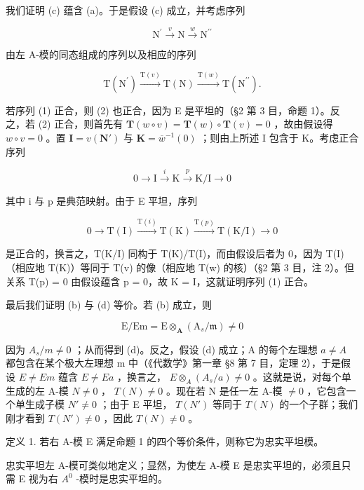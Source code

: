 我们证明 (c) 蕴含 (a)。于是假设 (c) 成立，并考虑序列

\[
\mathrm{N} ^ {\prime} \xrightarrow {v} \mathrm{N} \xrightarrow {w} \mathrm{N} ^ {\prime \prime}\tag{1}
\]

由左 A-模的同态组成的序列以及相应的序列

\[
\mathrm{T} \left(\mathrm{N} ^ {\prime}\right) \xrightarrow {\mathrm{T} (v)} \mathrm{T} (\mathrm{N}) \xrightarrow {\mathrm{T} (w)} \mathrm{T} \left(\mathrm{N} ^ {\prime \prime}\right).\tag{2}
\]

若序列 (1) 正合，则 (2) 也正合，因为 E 是平坦的（§2 第 3 目，命题 1）。反之，若 (2) 正合，则首先有 \(\mathbf{T}(w \circ v) = \mathbf{T}(w) \circ \mathbf{T}(v) = 0\) ，故由假设得 \(w \circ v = 0\) 。置 \(\mathbf{I} = v(\mathbf{N}')\) 与 \(\mathbf{K} = \overline{w}^{-1}(0)\) ；则由上所述 I 包含于 K。考虑正合序列

\[
0 \longrightarrow \mathrm{I} \stackrel {i} {\longrightarrow} \mathrm{K} \stackrel {p} {\longrightarrow} \mathrm{K} / \mathrm{I} \longrightarrow 0
\]

其中 i 与 p 是典范映射。由于 E 平坦，序列

\[
0 \longrightarrow \mathrm{T} (\mathrm{I}) \xrightarrow {\mathrm{T} (i)} \mathrm{T} (\mathrm{K}) \xrightarrow {\mathrm{T} (p)} \mathrm{T} (\mathrm{K} / \mathrm{I}) \longrightarrow 0
\]

是正合的，换言之，T(K/I) 同构于 T(K)/T(I)，而由假设后者为 0，因为 T(I)（相应地 T(K)）等同于 T(v) 的像（相应地 T(w) 的核）（§2 第 3 目，注 2）。但关系 T(p) = 0 由假设蕴含 p = 0，故 K = I，这就证明序列 (1) 正合。

最后我们证明 (b) 与 (d) 等价。若 (b) 成立，则

\[
\mathrm{E} / \mathrm{Em} = \mathrm{E} \otimes_ {\mathbf {A}} (\mathrm{A} _ {s} / \mathfrak {m}) \neq 0
\]

因为 \(A_{s}/m \neq 0\) ；从而得到 (d)。反之，假设 (d) 成立；A 的每个左理想 \(a \neq A\) 都包含在某个极大左理想 m 中（《代数学》第一章 §8 第 7 目，定理 2），于是假设 \(E \neq Em\) 蕴含 \(E \neq Ea\) ，换言之， \(E \otimes_{A} (A_{s}/a) \neq 0\) 。这就是说，对每个单生成的左 A-模 \(N \neq 0\) ， \(T(N) \neq 0\) 。现在若 N 是任一左 A-模 \(\neq 0\) ，它包含一个单生成子模 \(N' \neq 0\) ；由于 E 平坦， \(T(N')\) 等同于 \(T(N)\) 的一个子群；我们刚才看到 \(T(N') \neq 0\) ，因此 \(T(N) \neq 0\) 。

定义 1. 若右 A-模 E 满足命题 1 的四个等价条件，则称它为忠实平坦模。

忠实平坦左 A-模可类似地定义；显然，为使左 A-模 E 是忠实平坦的，必须且只需 E 视为右 \(A^{0}\) -模时是忠实平坦的。

